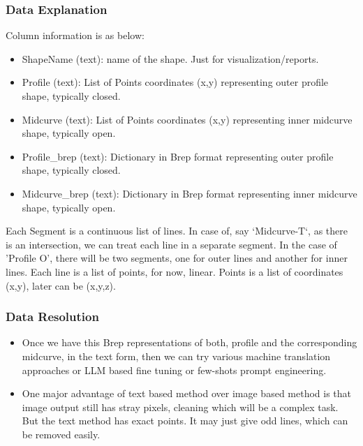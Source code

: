 \begin{frame}[fragile]\frametitle{Data Explanation}

Column information is as below:

\begin{itemize}
\item ShapeName (text): name of the shape. Just for visualization/reports.
\item Profile (text): List of Points coordinates (x,y) representing outer profile shape, typically closed.
\item Midcurve (text): List of Points coordinates (x,y) representing inner midcurve shape, typically open.
\item Profile\_brep (text): Dictionary in Brep format representing outer profile shape, typically closed.
\item Midcurve\_brep (text): Dictionary in Brep format representing inner midcurve shape, typically open.
\end{itemize}	

Each Segment is a continuous list of lines. In case of, say `Midcurve-T`, as there is an intersection, we can treat each line in a separate segment. In the case of 'Profile O', there will be two segments, one for outer lines and another for inner lines. Each line is a list of points, for now, linear. Points is a list of coordinates (x,y), later can be (x,y,z).

\end{frame}

\begin{frame}[fragile]\frametitle{Data Resolution}

\begin{itemize}
\item Once we have this Brep representations of both, profile and the corresponding midcurve, in the text form, then we can try various machine translation approaches or LLM based fine tuning or few-shots prompt engineering.
\item One major advantage of text based method over image based method is that image output still has stray pixels, cleaning which will be a complex task. But the text method has exact points. It may just give odd lines, which can be removed easily.
\end{itemize}	


\end{frame}

